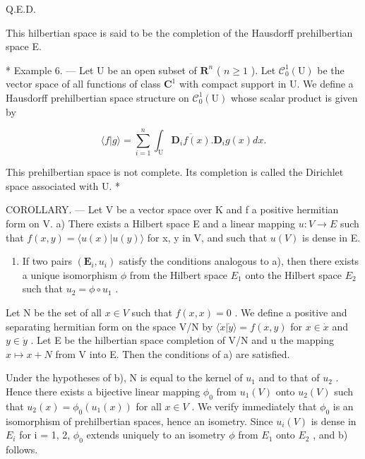 Q.E.D.

This hilbertian space is said to be the completion of the Hausdorff prehilbertian space E.

* Example 6. --- Let U be an open subset of \(\mathbf{R}^n\) ( \(n \geqslant 1\) ). Let \(\mathcal{C}_0^1(\mathrm{U})\) be the vector space of all functions of class \(\mathbf{C}^1\) with compact support in U. We define a Hausdorff prehilbertian space structure on \(\mathcal{C}_0^1(\mathrm{U})\) whose scalar product is given by

\[
\langle f | g \rangle = \sum_ {i = 1} ^ {n} \int_ {\mathrm{U}} \overline {{{{\mathbf {D} _ {i} f (x)}}}}. \mathbf {D} _ {i} g (x) d x.
\]

This prehilbertian space is not complete. Its completion is called the Dirichlet space associated with U. *

COROLLARY. --- Let V be a vector space over K and f a positive hermitian form on V. a) There exists a Hilbert space E and a linear mapping \(u:V \rightarrow E\) such that \(f(x,y) = \langle u(x)|u(y) \rangle\) for x, y in V, and such that \(u(V)\) is dense in E.

\begin{enumerate}
\def\labelenumi{\alph{enumi})}
\setcounter{enumi}{1}
\tightlist
\item
  If two pairs \((\mathbf{E}_{i}, u_{i})\) satisfy the conditions analogous to a), then there exists a unique isomorphism \(\phi\) from the Hilbert space \(E_{1}\) onto the Hilbert space \(E_{2}\) such that \(u_{2} = \phi \circ u_{1}\) .
\end{enumerate}

Let N be the set of all \(x \in V\) such that \(f(x, x) = 0\) . We define a positive and separating hermitian form on the space V/N by \(\langle \dot{x} | \dot{y} \rangle = f(x, y)\) for \(x \in \dot{x}\) and \(y \in \dot{y}\) . Let E be the hilbertian space completion of V/N and u the mapping \(x \mapsto x + N\) from V into E. Then the conditions of a) are satisfied.

Under the hypotheses of b), N is equal to the kernel of \(u_{1}\) and to that of \(u_{2}\) . Hence there exists a bijective linear mapping \(\phi_{0}\) from \(u_{1}(V)\) onto \(u_{2}(V)\) such that \(u_{2}(x) = \phi_{0}(u_{1}(x))\) for all \(x \in V\) . We verify immediately that \(\phi_{0}\) is an isomorphism of prehilbertian spaces, hence an isometry. Since \(u_{i}(V)\) is dense in \(E_{i}\) for i = 1, 2, \(\phi_{0}\) extends uniquely to an isometry \(\phi\) from \(E_{1}\) onto \(E_{2}\) , and b) follows.

